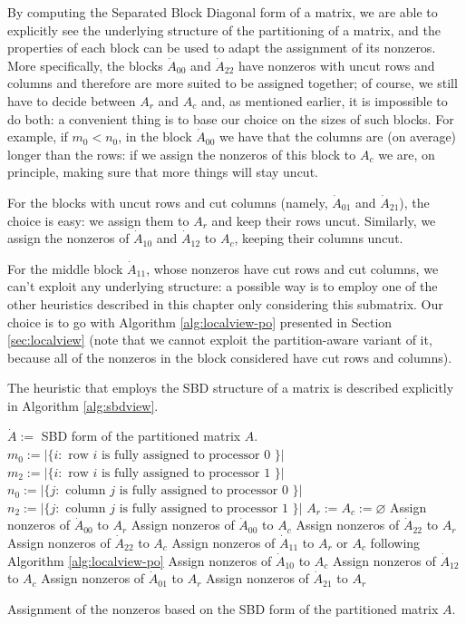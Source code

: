 By computing the Separated Block Diagonal form of a matrix, we are able to explicitly see the underlying structure of the partitioning of a matrix, and the properties of each block can be used to adapt the assignment of its nonzeros. More specifically, the blocks $\dot{A}_{00}$ and $\dot{A}_{22}$ have nonzeros with uncut rows and columns and therefore are more suited to be assigned together; of course, we still have to decide between $A_r$ and $A_c$ and, as mentioned earlier, it is impossible to do both: a convenient thing is to base our choice on the sizes of such blocks. For example, if $m_0 < n_0$, in the block $\dot{A}_{00}$ we have that the columns are (on average) longer than the rows: if we assign the nonzeros of this block to $A_c$ we are, on principle, making sure that more things will stay uncut.

For the blocks with uncut rows and cut columns (namely, $\dot{A}_{01}$ and $\dot{A}_{21}$), the choice is easy: we assign them to $A_r$ and keep their rows uncut. Similarly, we assign the nonzeros of $\dot{A}_{10}$ and $\dot{A}_{12}$ to $A_c$, keeping their columns uncut. 

For the middle block $\dot{A}_{11}$, whose nonzeros have cut rows and cut columns, we can't exploit any underlying structure: a possible way is to employ one of the other heuristics described in this chapter only considering this submatrix. Our choice is to go with Algorithm \ref{alg:localview-po} presented in Section \ref{sec:localview} (note that we cannot exploit the partition-aware variant of it, because all of the nonzeros in the block considered have cut rows and columns).

The heuristic that employs the SBD structure of a matrix is described explicitly in Algorithm \ref{alg:sbdview}.

\begin{algorithm}[h]
	\begin{algorithmic}
		\State
		\State $\dot{A}:=$ SBD form of the partitioned matrix $A$.
		\State $m_0 := |\{ i : \text{ row } i \text{ is fully assigned to processor 0 } \}|$
		\State $m_2 := |\{ i : \text{ row } i \text{ is fully assigned to processor 1 } \}|$
		\State $n_0 := |\{ j : \text{ column } j \text{ is fully assigned to processor 0 } \}|$
		\State $n_2 := |\{ j : \text{ column } j \text{ is fully assigned to processor 1 } \}|$
		\State $A_r := A_c := \varnothing$
		\State Assign nonzeros of $\dot{A}_{00}$ to $A_r$
		\Else
		\State Assign nonzeros of $\dot{A}_{00}$ to $A_c$
		\EndIf
		\State Assign nonzeros of $\dot{A}_{22}$ to $A_r$
		\Else
		\State Assign nonzeros of $\dot{A}_{22}$ to $A_c$
		\EndIf
		\State Assign nonzeros of $\dot{A}_{11}$ to $A_r$ or $A_c$ following Algorithm \ref{alg:localview-po}
		\State Assign nonzeros of $\dot{A}_{10}$ to $A_c$
		\State Assign nonzeros of $\dot{A}_{12}$ to $A_c$
		\State Assign nonzeros of $\dot{A}_{01}$ to $A_r$
		\State Assign nonzeros of $\dot{A}_{21}$ to $A_r$
	\end{algorithmic}
	\caption{Assignment of the nonzeros based on the SBD form of the partitioned matrix $A$.} \label{alg:sbdview}
\end{algorithm}


